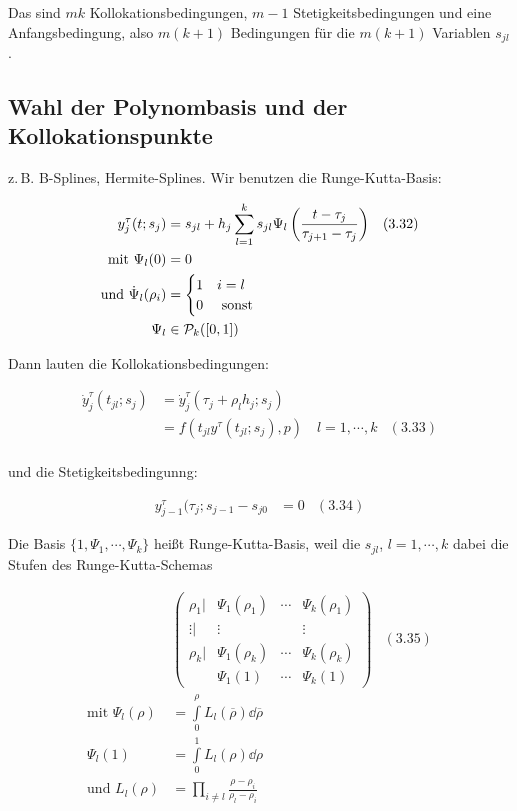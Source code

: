 Das sind $mk$ Kollokationsbedingungen, $m-1$ Stetigkeitsbedingungen und eine Anfangsbedingung, also $m(k+1)$ Bedingungen für die $m(k+1)$ Variablen $s_{jl}$.

\subsection*{Wahl der Polynombasis und der Kollokationspunkte}

z.\,B. B-Splines, Hermite-Splines. Wir benutzen die Runge-Kutta-Basis:

\begin{align*}
y_j^\tau(t;s_j) &= s_{jl} + h_j \sum\limits_{l=1}^k s_{jl} \Psi_l \left( \frac{t-\tau_j}{\tau_{j+1}-\tau_j} \right) & (3.32) \\
\text{mit } \Psi_l(0) &= 0 \\
\text{und } \dot\Psi_l(\rho_i) &= \begin{cases} 1 & i=l \\ 0 & \text{ sonst } \end{cases} \\
\Psi_l & \in \mathcal{P}_k([0,1])
\end{align*}

Dann lauten die Kollokationsbedingungen:

\begin{align*}
\dot y_j^\tau(t_{jl}; s_j) &= \dot y_j^\tau(\tau_j+\rho_l h_j; s_j) \\
&= f(t_{jl} y^\tau(t_{jl}; s_j),p) \quad l=1,\cdots,k & (3.33) \\
\end{align*}

und die Stetigkeitsbedingunng:

\begin{align*}
y_{j-1}^\tau (\tau_j; s_{j-1} - s_{j0} &= 0 & (3.34) 
\end{align*}

Die Basis $\{1,\Psi_1,\cdots,\Psi_k\}$ heißt Runge-Kutta-Basis, weil die $s_{jl}$, $l=1,\cdots,k$ dabei die Stufen des Runge-Kutta-Schemas

\begin{align*}
& \begin{pmatrix} \rho_1 | & \Psi_1(\rho_1) & \cdots & \Psi_k(\rho_1) \\ \vdots | & \vdots & & \vdots \\ \rho_k | & \Psi_1(\rho_k) & \cdots & \Psi_k(\rho_k) \\ & \Psi_1(1) & \cdots & \Psi_k(1) \end{pmatrix}  & (3.35)\\ 
\text{mit } \Psi_l(\rho) &= \int\limits_0^\rho L_l ( \overline \rho) \dd \overline \rho \\
\Psi_l(1) &= \int\limits_0^1 L_l (\rho) \dd \rho \\
\text{und } L_l(\rho) &= \prod\limits_{i \neq l} \frac{\rho-\rho_i}{\rho_l-\rho_i}
\end{align*}

